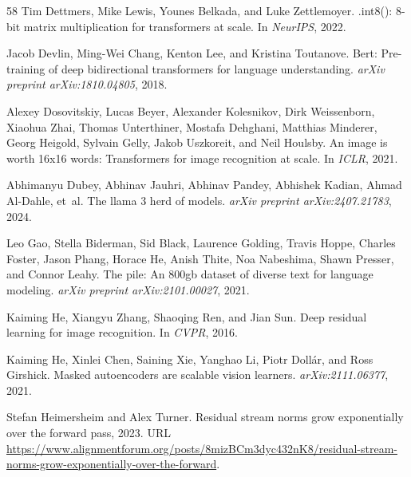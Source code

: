 \documentclass[10pt]{article}
\theoremstyle{definition}
\theoremstyle{plain}
\begin{document}
\begin{thebibliography}{58}
Tim Dettmers, Mike Lewis, Younes Belkada, and Luke Zettlemoyer.
.int8(): 8-bit matrix multiplication for transformers at scale.
\newblock In \emph{NeurIPS}, 2022.

Jacob Devlin, Ming-Wei Chang, Kenton Lee, and Kristina Toutanove.
\newblock Bert: Pre-training of deep bidirectional transformers for language understanding.
\newblock \emph{arXiv preprint arXiv:1810.04805}, 2018.

Alexey Dosovitskiy, Lucas Beyer, Alexander Kolesnikov, Dirk Weissenborn, Xiaohua Zhai, Thomas Unterthiner, Mostafa Dehghani, Matthias Minderer, Georg Heigold, Sylvain Gelly, Jakob Uszkoreit, and Neil Houlsby.
\newblock An image is worth 16x16 words: Transformers for image recognition at scale.
\newblock In \emph{ICLR}, 2021.

Abhimanyu Dubey, Abhinav Jauhri, Abhinav Pandey, Abhishek Kadian, Ahmad Al-Dahle, et~al.
\newblock The llama 3 herd of models.
\newblock \emph{arXiv preprint arXiv:2407.21783}, 2024.

Leo Gao, Stella Biderman, Sid Black, Laurence Golding, Travis Hoppe, Charles Foster, Jason Phang, Horace He, Anish Thite, Noa Nabeshima, Shawn Presser, and Connor Leahy.
\newblock The pile: An 800gb dataset of diverse text for language modeling.
\newblock \emph{arXiv preprint arXiv:2101.00027}, 2021.

Kaiming He, Xiangyu Zhang, Shaoqing Ren, and Jian Sun.
\newblock Deep residual learning for image recognition.
\newblock In \emph{CVPR}, 2016.

Kaiming He, Xinlei Chen, Saining Xie, Yanghao Li, Piotr Dollár, and Ross Girshick.
\newblock Masked autoencoders are scalable vision learners.
\newblock \emph{arXiv:2111.06377}, 2021.

Stefan Heimersheim and Alex Turner.
\newblock Residual stream norms grow exponentially over the forward pass, 2023.
\newblock URL \url{https://www.alignmentforum.org/posts/8mizBCm3dyc432nK8/residual-stream-norms-grow-exponentially-over-the-forward}.


\end{thebibliography}
\end{document}
